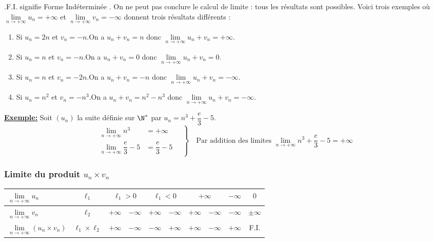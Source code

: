 \documentclass[11pt,twoside, openany]{extbook}
\begin{document}
\begin{Remarque}
    .F.I. signifie \og Forme Indéterminée \fg{}. On ne peut pas conclure le calcul de limite : tous les résultats sont possibles. Voici trois exemples où $\lim\limits_{n \rightarrow +\infty}u_n=+\infty$ et $\lim\limits_{n \rightarrow +\infty} v_n=-\infty$ donnent trois résultats différents : 

\begin{enumerate}
\item Si $u_n= 2n$ et $v_n=-n$.\quad On a \quad $u_n+v_n= n$ \quad donc \quad $\lim\limits_{n \rightarrow +\infty} u_n + v_n =+\infty$.\vspace{0.5em}
\item Si $u_n= n$ et $v_n=-n$.\quad On a \quad $u_n+v_n=0$ \quad donc \quad $\lim\limits_{n \rightarrow +\infty} u_n + v_n =0$.\vspace{0.5em}
\item Si $u_n=n$ et $v_n=-2n$.\quad On a \quad $u_n+v_n=-n$ \quad donc \quad $\lim\limits_{n \rightarrow +\infty} u_n + v_n =-\infty$.\vspace{0.5em}
\item Si $u_n=n^2$ et $v_n=-n^3$.\quad On a \quad $u_n+v_n=n^2-n^3$ \quad donc \quad $\lim\limits_{n \rightarrow +\infty} u_n + v_n =-\infty$.
\end{enumerate}
\end{Remarque}
\newpage
\textbf{\ul{Exemple:}}
Soit $(u_n)$ la suite définie sur $\N^*$ par 
$u_n=n^3+\dfrac{e}{3}-5$. 
\begin{equation*}
	\left.
	\begin{aligned}
		 \lim\limits_{n \rightarrow +\infty} n^3 &= +\infty \quad \\
		\lim\limits_{n \rightarrow +\infty} \dfrac{e}{3}-5 &= \dfrac{e}{3}-5 \quad
	\end{aligned}
	\right\}
	\quad \text{Par addition des limites $\lim\limits_{n \rightarrow +\infty} n^3+\dfrac{e}{3}-5=+\infty$}
\end{equation*}
\subsubsection{Limite du produit $u_n \times v_n$}

{\renewcommand{\arraystretch}{1.2} %
{\setlength{\tabcolsep}{0.4cm} %
\begin{tabular}{|l||*{8}{c|}>{\columncolor[RGB]{211, 211, 211}}c|}\hline
$\lim\limits_{n \rightarrow +\infty} u_n$ & $\ell_1$ & \multicolumn{2}{c|}{$\ell_1>0$} & \multicolumn{2}{c|}{$\ell_1<0$} & \multicolumn{2}{c|}{$+\infty$} & $-\infty$ & $0$\\
\hline
$\lim\limits_{n \rightarrow +\infty} v_n$  & $\ell_2$ & $+\infty$ & $-\infty$ & $+\infty$ & $-\infty$ & $+\infty$ & $-\infty$ & $-\infty$ & $\pm\infty$\\
\hline
\hline
$\lim\limits_{n \rightarrow +\infty} (u_n\times v_n)$ & $\ell_1\times\ell_2$ & $+\infty$ & $-\infty$ & $-\infty$ & $+\infty$ & $+\infty$ & $-\infty$ & $+\infty$ & F.I. \\
\hline
\end{tabular}}}\\
\end{document}

